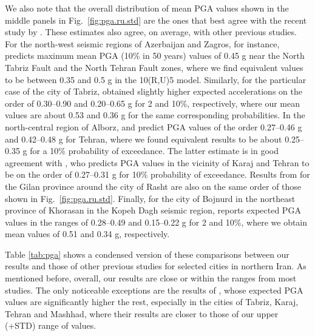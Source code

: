 We also note that the overall distribution of mean PGA values shown in the middle panels in Fig.~\ref{fig:pga.ru.std} are the ones that best agree with the recent study by \citet{Khodaverdian_2016_BSSA}. These estimates also agree, on average, with other previous studies. For the north-west seismic regions of Azerbaijan and Zagros, for instance, \citet{Tavakoli1999} predicts maximum mean PGA (10\% in 50 years) values of 0.45 g near the North Tabriz Fault and the North Tehran Fault zones, where we find equivalent values to be between 0.35 and 0.5 g in the 10(R,U)5 model. Similarly, for the particular case of the city of Tabriz, \citet{Vafaie2011} obtained slightly higher expected accelerations on the order of 0.30--0.90 and 0.20--0.65 g for 2 and 10\%, respectively, where our mean values are about 0.53 and 0.36 g for the same corresponding probabilities. In the north-central region of Alborz, \citet{Ghodrati2003} and \citet{Boostan2015} predict PGA values of the order 0.27--0.46 g and 0.42--0.48 g for Tehran, where we found equivalent results to be about 0.25--0.35 g for a 10\% probability of exceedance. The latter estimate is in good agreement with \citet{Abdi2013}, who predicts PGA values in the vicinity of Karaj and Tehran to be on the order of 0.27--0.31 g for 10\% probability of exceedance. Results from \citet{Ghodrati2008} for the Gilan province around the city of Rasht are also on the same order of those shown in Fig.~\ref{fig:pga.ru.std}. Finally, for the city of Bojnurd in the northeast province of Khorasan in the Kopeh Dagh seismic region, \citet{Rahgozar2012} reports expected PGA values in the ranges of 0.28--0.49 and 0.15--0.22 g for 2 and 10\%, where we obtain mean values of 0.51 and 0.34 g, respectively.

Table \ref{tab:pga} shows a condensed version of these comparisons between our results and those of other previous studies for selected cities in northern Iran. As mentioned before, overall, our results are close or within the ranges from most studies. The only noticeable exceptions are the results of \citet{Golara2014}, whose expected PGA values are significantly higher the rest, especially in the cities of Tabriz, Karaj, Tehran and Mashhad, where their results are closer to those of our upper (+STD) range of values. 



